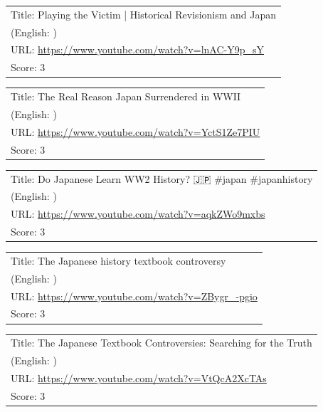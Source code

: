 \documentclass{article}
\begin{document}
\noindent
\begin{tabular}{p{}}
Title: Playing the Victim | Historical Revisionism and Japan \\
(English: ) \\
URL: \url{https://www.youtube.com/watch?v=lnAC-Y9p_sY} \\
Score: 3 \\
\end{tabular}
\vspace{0.5em}

\noindent
\begin{tabular}{p{}}
Title: The Real Reason Japan Surrendered in WWII \\
(English: ) \\
URL: \url{https://www.youtube.com/watch?v=YctS1Ze7PIU} \\
Score: 3 \\
\end{tabular}
\vspace{0.5em}

\noindent
\begin{tabular}{p{}}
Title: Do Japanese Learn WW2 History? 🇯🇵 \#japan \#japanhistory \\
(English: ) \\
URL: \url{https://www.youtube.com/watch?v=aqkZWo9mxbs} \\
Score: 3 \\
\end{tabular}
\vspace{0.5em}

\noindent
\begin{tabular}{p{}}
Title: The Japanese history textbook controversy \\
(English: ) \\
URL: \url{https://www.youtube.com/watch?v=ZBygr_-pgio} \\
Score: 3 \\
\end{tabular}
\vspace{0.5em}

\noindent
\begin{tabular}{p{}}
Title: The Japanese Textbook Controversies: Searching for the Truth \\
(English: ) \\
URL: \url{https://www.youtube.com/watch?v=VtQcA2XcTAs} \\
Score: 3 \\
\end{tabular}
\vspace{0.5em}
\end{document}
